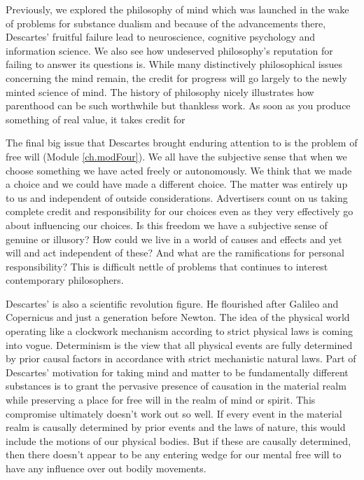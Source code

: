 Previously, we explored the philosophy of mind which was  launched in the wake of problems for substance dualism and because of the advancements there, Descartes' fruitful failure lead to neuroscience, cognitive psychology and information science. We also see how undeserved philosophy’s reputation for failing to answer its questions is. While many distinctively philosophical issues concerning the mind remain, the credit for progress will go largely to the newly minted science of mind. The history of philosophy nicely illustrates how parenthood can be such worthwhile but thankless work. As soon as you produce something of real value, it takes credit for 

The final big issue that Descartes brought enduring attention to is the problem of free will (Module \ref{ch.modFour}). We all have the subjective sense that when we choose something we have acted freely or autonomously. We think that we made a choice and we could have made a different choice. The matter was entirely up to us and independent of outside considerations. Advertisers count on us taking complete credit and responsibility for our choices even as they very effectively go about influencing our choices. Is this freedom we have a subjective sense of genuine or illusory? How could we live in a world of causes and effects and yet will and act independent of these? And what are the ramifications for personal responsibility? This is difficult nettle of problems that continues to interest contemporary philosophers.

Descartes’ is also a scientific revolution figure. He flourished after Galileo and Copernicus and just a generation before Newton. The idea of the physical world operating like a clockwork mechanism according to strict physical laws is coming into vogue. Determinism is the view that all physical events are fully determined by prior causal factors in accordance with strict mechanistic natural laws. Part of Descartes’ motivation for taking mind and matter to be fundamentally different substances is to grant the pervasive presence of causation in the material realm while preserving a place for free will in the realm of mind or spirit. This compromise ultimately doesn’t work out so well. If every event in the material realm is causally determined by prior events and the laws of nature, this would include the motions of our physical bodies. But if these are causally determined, then there doesn’t appear to be any entering wedge for our mental free will to have any influence over out bodily movements.

